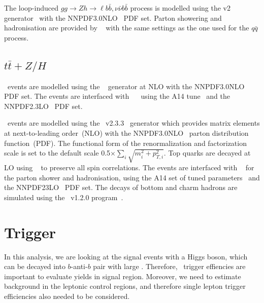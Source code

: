 \par The loop-induced $gg\to Zh \to \ell b\bar{b}, \nu\bar{\nu}b\bar{b}$ process is modelled using the \powhegbox v2 generator~\cite{Alioli:2010xd} with the NNPDF3.0NLO~\cite{Ball:2014uwa} PDF set.
Parton showering and hadronisation are provided by \pythia~\cite{Sjostrand:2014zea} with the same settings as the one used for the $q\bar{q}$ process.

\subsection{$t\bar{t}+Z/H$}

\par \ttH~events are modelled using the \powhegbox~\cite{Frixione:2007nw,Nason:2004rx,Frixione:2007vw,Alioli:2010xd,Hartanto:2015uka}
generator at NLO with the NNPDF3.0NLO~\cite{Ball:2014uwa} PDF set.
The events are interfaced with \pythia~\cite{Sjostrand:2014zea}~ using the A14 tune~\cite{ATL-PHYS-PUB-2014-021} and the NNPDF2.3LO~\cite{Ball:2014uwa} PDF set.

\par \ttV~events are modelled using the \mgamc~v2.3.3~\cite{Alwall:2014hca} generator which provides matrix elements at next-to-leading order~(NLO) with the NNPDF3.0NLO~\cite{Ball:2014uwa} parton distribution function~(PDF).
The functional form of the renormalization and factorization scale is set to the default scale 0.5$\times \sum_i \sqrt{m^2_i+p^2_{T,i}}$.
Top quarks are decayed at LO using \madspin~\cite{Frixione:2007zp,Artoisenet:2012st} to preserve all spin correlations.
The events are interfaced with \pythia~\cite{Sjostrand:2014zea} for the parton shower and hadronisation,
using the A14 set of tuned parameters~\cite{ATL-PHYS-PUB-2014-021}  and the NNPDF23LO~\cite{Ball:2014uwa} PDF set.
The decays of bottom and charm hadrons are simulated using the \evtgen\ v1.2.0 program~\cite{EvtGen}.

\section{Trigger}
\label{sec:trigger}

\par In this analysis, we are looking at the signal events with a Higgs boson, which can be decayed into $b$-anti-$b$ pair with large \met. 
Therefore, \met~trigger effiencies are important to evaluate yields in signal region. 
Moreover, we need to estimate background in the leptonic control regions, and therefore single lepton trigger efficiencies also needed to be considered.

